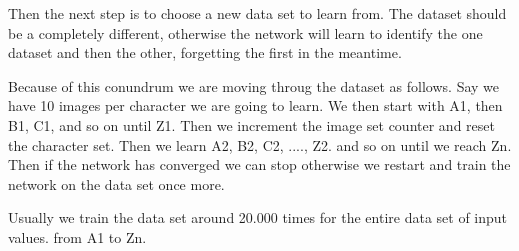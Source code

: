 Then the next step is to choose a new data set to learn from. The dataset should
be a completely different, otherwise the network will learn to identify the one
dataset and then the other, forgetting the first in the meantime.

Because of this conundrum we are moving throug the dataset as follows. Say we
have 10 images per character we are going to learn.  We then start with A1, then
B1, C1, and so on until Z1. Then we increment the image set counter and reset
the character set.  Then we learn A2, B2, C2, ...., Z2. and so on until we reach
Zn.  Then if the network has converged we can stop otherwise we restart and
train the network on the data set once more.

Usually we train the data set around 20.000 times for the entire data set of
input values. from A1 to Zn.


